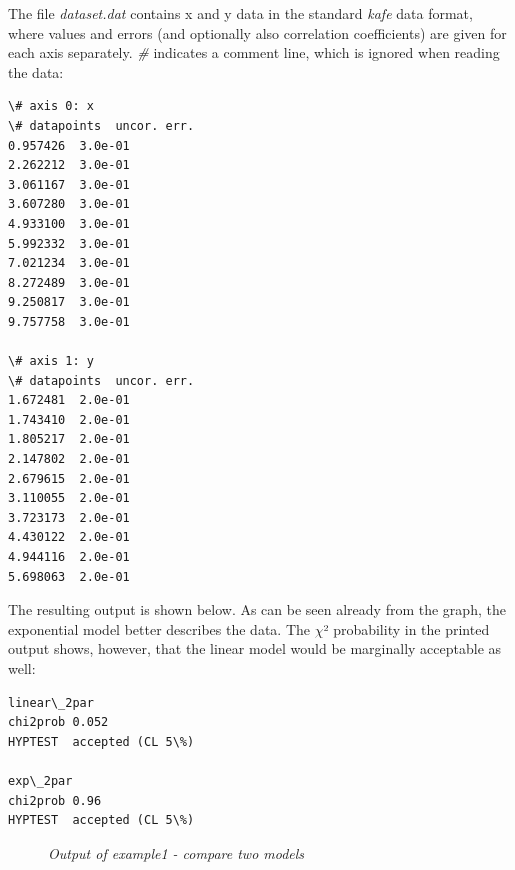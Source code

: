 \documentclass[a4paper,10pt,english]{sphinxmanual}
\begin{document}
The file \emph{dataset.dat} contains x and y data in the standard \emph{kafe} data
format, where values and errors (and optionally also correlation coefficients)
are given for each axis separately. \emph{\#} indicates a comment line, which
is ignored when reading the data:

\begin{Verbatim}[commandchars=\\\{\}]
\# axis 0: x
\# datapoints  uncor. err.
0.957426  3.0e-01
2.262212  3.0e-01
3.061167  3.0e-01
3.607280  3.0e-01
4.933100  3.0e-01
5.992332  3.0e-01
7.021234  3.0e-01
8.272489  3.0e-01
9.250817  3.0e-01
9.757758  3.0e-01

\# axis 1: y
\# datapoints  uncor. err.
1.672481  2.0e-01
1.743410  2.0e-01
1.805217  2.0e-01
2.147802  2.0e-01
2.679615  2.0e-01
3.110055  2.0e-01
3.723173  2.0e-01
4.430122  2.0e-01
4.944116  2.0e-01
5.698063  2.0e-01
\end{Verbatim}

The resulting output is shown below. As can be seen already
from the graph, the exponential model better describes the
data. The \(\chi\)² probability in the printed output shows, however,
that the linear model would be marginally acceptable as well:

\begin{Verbatim}[commandchars=\\\{\}]
linear\_2par
chi2prob 0.052
HYPTEST  accepted (CL 5\%)

exp\_2par
chi2prob 0.96
HYPTEST  accepted (CL 5\%)
\end{Verbatim}
\begin{figure}[htbp]
\centering
\capstart

\caption{\emph{Output of example1 - compare two models}}\end{figure}
\end{document}
